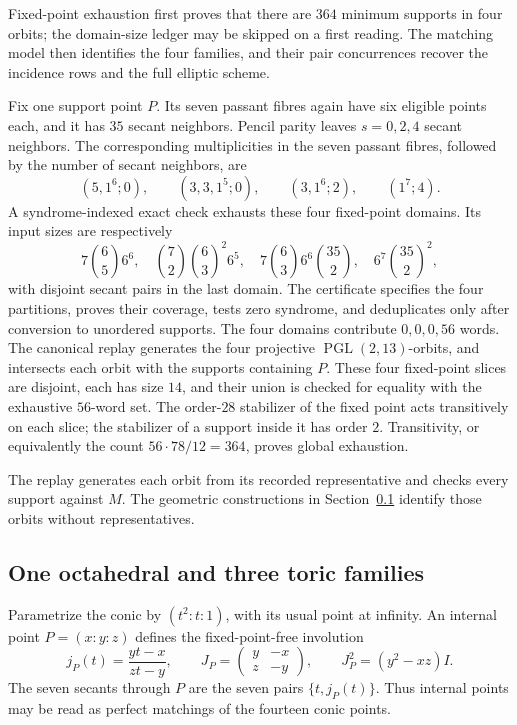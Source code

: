 \documentclass[11pt]{article}
\theoremstyle{definition}
\theoremstyle{remark}
\newcommand{\PGL}{\operatorname{PGL}}
\begin{document}
Fixed-point exhaustion first proves that there are \(364\) minimum supports in
four orbits; the domain-size ledger may be skipped on a first reading.  The
matching model then identifies the four families, and their pair concurrences recover the
incidence rows and the full elliptic scheme.

Fix one support point \(P\).  Its seven passant fibres again have six eligible
points each, and it has \(35\) secant neighbors.  Pencil parity leaves
\(s=0,2,4\) secant neighbors.
The corresponding multiplicities in the seven passant fibres, followed by
the number of secant neighbors, are
\[
 (5,1^6;0),\qquad (3,3,1^5;0),\qquad
 (3,1^6;2),\qquad (1^7;4).
\]
A syndrome-indexed exact check exhausts these four fixed-point domains.  Its
input sizes are respectively
\[
 7\binom65 6^6,\quad
 \binom72\binom63^2 6^5,\quad
 7\binom63 6^6\binom{35}{2},\quad
 6^7\binom{35}{2}^2,
\]
with disjoint secant pairs in the last domain.  The certificate specifies the
four partitions, proves their coverage, tests zero syndrome, and deduplicates
only after conversion to unordered supports.  The four domains contribute
\(0,0,0,56\) words.  The canonical replay generates the four projective
\(\PGL(2,13)\)-orbits, and intersects each orbit with the supports containing
\(P\).  These four fixed-point slices are disjoint, each has size \(14\), and
their union is checked for equality with the exhaustive \(56\)-word set.
The order-\(28\) stabilizer of the fixed point acts transitively on each
slice; the stabilizer of a support inside it has order \(2\).
Transitivity, or equivalently the count \(56\cdot78/12=364\), proves global
exhaustion.

The replay generates each orbit from its recorded representative and checks
every support against \(M\).  The geometric constructions in
Section~\ref{sec:minimum-families} identify those orbits without
representatives.

\subsection{One octahedral and three toric families}
\label{sec:minimum-families}

Parametrize the conic by \((t^2:t:1)\), with its usual point at infinity.
An internal point \(P=(x:y:z)\) defines the fixed-point-free involution
\[
 j_P(t)=\frac{yt-x}{zt-y},\qquad
 J_P=\begin{pmatrix}y&-x\\z&-y\end{pmatrix},\qquad
 J_P^2=(y^2-xz)I.
\]
The seven secants through \(P\) are the seven pairs
\(\{t,j_P(t)\}\).  Thus internal points may be read as perfect matchings of
the fourteen conic points.
\end{document}

